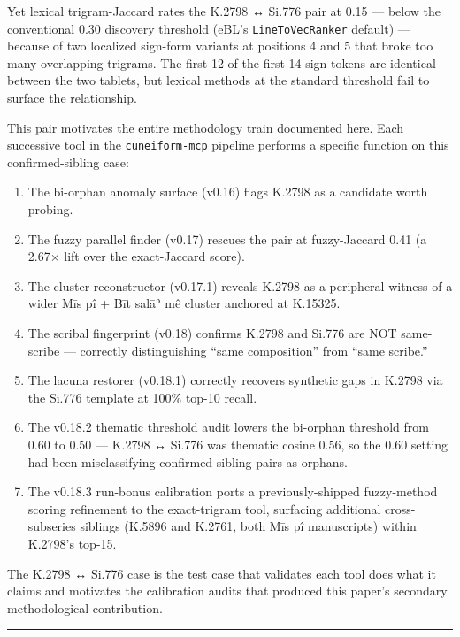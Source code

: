 \documentclass[
  11pt,
  letterpaper,
]{article}
\providecommand{\tightlist}{%
  \setlength{\itemsep}{0pt}\setlength{\parskip}{0pt}}
\begin{document}
Yet lexical trigram-Jaccard rates the K.2798 ↔ Si.776 pair at 0.15 ---
below the conventional 0.30 discovery threshold (eBL's
\texttt{LineToVecRanker} default) --- because of two localized sign-form
variants at positions 4 and 5 that broke too many overlapping trigrams.
The first 12 of the first 14 sign tokens are identical between the two
tablets, but lexical methods at the standard threshold fail to surface
the relationship.

This pair motivates the entire methodology train documented here. Each
successive tool in the \texttt{cuneiform-mcp} pipeline performs a
specific function on this confirmed-sibling case:

\begin{enumerate}
\def\labelenumi{\arabic{enumi}.}
\tightlist
\item
  The bi-orphan anomaly surface (v0.16) flags K.2798 as a candidate
  worth probing.
\item
  The fuzzy parallel finder (v0.17) rescues the pair at fuzzy-Jaccard
  0.41 (a 2.67× lift over the exact-Jaccard score).
\item
  The cluster reconstructor (v0.17.1) reveals K.2798 as a peripheral
  witness of a wider Mīs pî + Bīt salāʾ mê cluster anchored at K.15325.
\item
  The scribal fingerprint (v0.18) confirms K.2798 and Si.776 are NOT
  same-scribe --- correctly distinguishing ``same composition'' from
  ``same scribe.''
\item
  The lacuna restorer (v0.18.1) correctly recovers synthetic gaps in
  K.2798 via the Si.776 template at 100\% top-10 recall.
\item
  The v0.18.2 thematic threshold audit lowers the bi-orphan threshold
  from 0.60 to 0.50 --- K.2798 ↔ Si.776 was thematic cosine 0.56, so the
  0.60 setting had been misclassifying confirmed sibling pairs as
  orphans.
\item
  The v0.18.3 run-bonus calibration ports a previously-shipped
  fuzzy-method scoring refinement to the exact-trigram tool, surfacing
  additional cross-subseries siblings (K.5896 and K.2761, both Mīs pî
  manuscripts) within K.2798's top-15.
\end{enumerate}

The K.2798 ↔ Si.776 case is the test case that validates each tool does
what it claims and motivates the calibration audits that produced this
paper's secondary methodological contribution.

\begin{center}\rule{0.5\linewidth}{0.5pt}\end{center}
\end{document}
